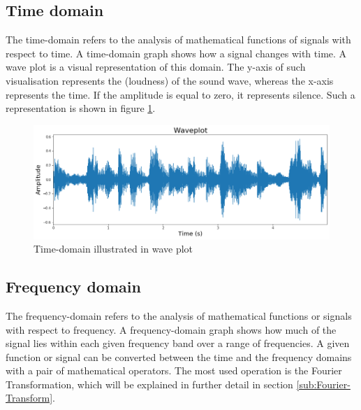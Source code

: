\subsection{Time domain}
\label{sub:Time-Domain}

The time-domain refers to the analysis of mathematical functions of signals with respect to time. A time-domain graph shows how a signal changes with time. 
\newline
\newline
A wave plot is a visual representation of this domain. The y-axis of such visualisation represents the  (loudness) of the sound wave, whereas the x-axis represents the time. If the amplitude is equal to zero, it represents silence. Such a representation is shown in figure \ref{fig:Waveplot-Time-Domain}.
\begin{figure}[htbp]
	\centering
	\includegraphics[scale=0.45]{baa-documentation/img/Waveplot_Visualisation.png}
	\caption[Time-domain illustrated in wave plot]{Time-domain illustrated in wave plot}
	\label{fig:Waveplot-Time-Domain}
\end{figure}

\subsection{Frequency domain}
\label{sub:Frequency-Domain}

The frequency-domain refers to the analysis of mathematical functions or signals with respect to frequency. A frequency-domain graph shows how much of the signal lies within each given frequency band over a range of frequencies. 
\newline
\newline
A given function or signal can be converted between the time and the frequency domains with a pair of mathematical operators. The most used operation is the Fourier Transformation, which will be explained in further detail in section \ref{sub:Fourier-Transform}.

